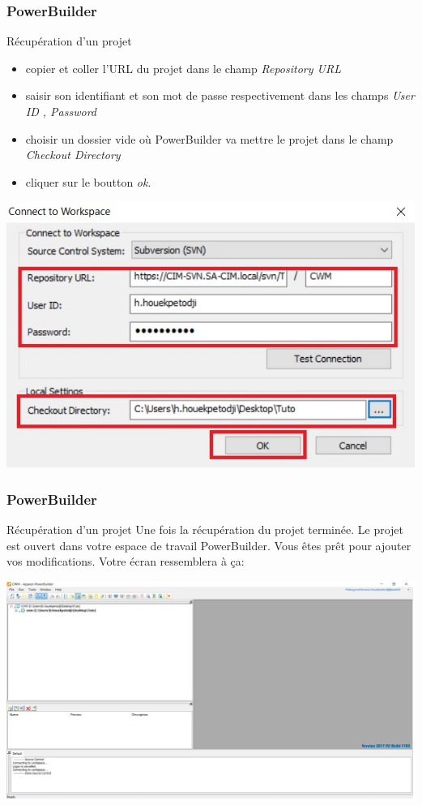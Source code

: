 \documentclass{beamer}
\begin{document}
\begin{frame}
\frametitle{PowerBuilder}
\begin{block}{Récupération d'un projet}
\begin{itemize}
\item copier et coller l'URL du projet dans le champ \alert{\textit{Repository URL}}
\item saisir son identifiant et son mot de passe respectivement dans les champs \alert{\textit{User ID , Password}}
\item choisir un dossier vide où PowerBuilder va mettre le projet dans le champ \alert{\textit{Checkout Directory}}
\item cliquer sur le boutton \alert{\textit{ok}}. 
\end{itemize}
\end{block}
\includegraphics[scale=0.4]{../images/connect2.jpg}
\end{frame}
\begin{frame} 
\frametitle{PowerBuilder}
\begin{block}{Récupération d'un projet}
Une fois la récupération du projet terminée. Le projet est ouvert dans votre espace de travail PowerBuilder. Vous êtes prêt pour ajouter vos modifications. Votre écran ressemblera à ça:

\end{block}
\includegraphics[scale=0.25]{../images/connect3.jpg}
\end{frame}
\end{document}
